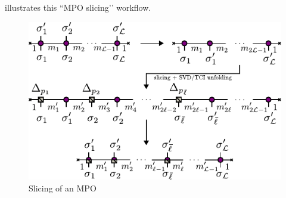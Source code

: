  illustrates this “MPO slicing’’ workflow.

\begin{figure}[ht!]
    \centering
    \includegraphics{figures/SlicingMPO.pdf}
    \caption{Slicing of an MPO}
    \label{fig:MPOSlicing}
\end{figure}


